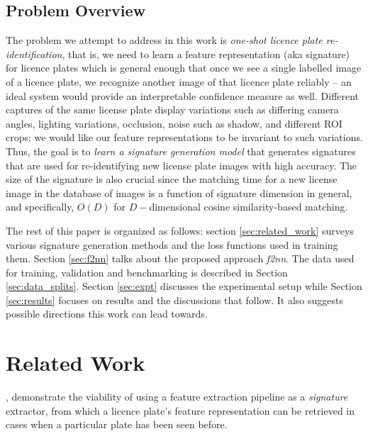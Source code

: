 \documentclass[10pt,twocolumn,letterpaper]{article}
\begin{document}
    \subsection{Problem Overview \label{sec:Introduction:overview}}
        The problem we attempt to address in this work is \emph{one-shot licence plate re-identification}, that is, we need to learn a feature representation (aka signature) for licence plates which is general enough that once we see a single labelled image of a licence plate, we recognize another image of that licence plate reliably -- an ideal system would provide an interpretable confidence measure as well. Different captures of the same license plate display variations such as differing camera angles, lighting variations, occlusion, noise such as shadow, and different ROI crops: we would like our feature representations to be invariant to such variations. Thus, the goal is to \textit{learn a signature generation model} that generates signatures that are used for re-identifying new license plate images with high accuracy. The size of the signature is also crucial since the matching time for a new license image in the database of images is a function of signature dimension in general, and specifically, $O(D)$ for $D-$dimensional cosine similarity-based matching. 
        
        The rest of this paper is organized as follows: section \ref{sec:related_work} surveys various signature generation methods and the loss functions used in training them. Section \ref{sec:f2nn} talks about the proposed approach \emph{f2nn}. %
        The data used for training, validation and benchmarking is described in Section \ref{sec:data_splits}. Section \ref{sec:expt} discusses the experimental setup while Section \ref{sec:results} focuses on results and the discussions that follow. %
        It also suggests possible directions this work can lead towards.

\section{Related Work \label{sec:related_work}}
    \cite{rodriguez2012data},\cite{serrano2013methods} demonstrate the viability of using a feature extraction pipeline as a \emph{signature} extractor, from which a licence plate's feature representation can be retrieved in cases when a particular plate has been seen before.
    
\end{document}
